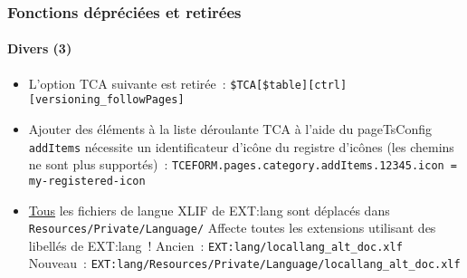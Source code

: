 \begin{frame}[fragile]
	\frametitle{Fonctions dépréciées et retirées}
	\framesubtitle{Divers (3)}


	\begin{itemize}

		\item L'option TCA suivante est retirée~:\newline
			\texttt{\$TCA[\$table][ctrl][versioning\_followPages]}

		\item Ajouter des éléments à la liste déroulante TCA à l'aide du pageTsConfig \texttt{addItems}
			nécessite un identificateur d'icône du registre d'icônes (les chemins ne sont plus supportés)~:\newline
			\smaller
				\texttt{TCEFORM.pages.category.addItems.12345.icon = my-registered-icon}
			\normalsize

		\item \underline{Tous} les fichiers de langue XLIF de EXT:lang sont déplacés dans\newline
			\texttt{Resources/Private/Language/}\newline
			Affecte toutes les extensions utilisant des libellés de EXT:lang~!\newline
			\smaller
				Ancien~: \texttt{EXT:lang/locallang\_alt\_doc.xlf}\newline
				Nouveau~: \texttt{EXT:lang/Resources/Private/Language/locallang\_alt\_doc.xlf}
			\normalsize

	\end{itemize}

\end{frame}







